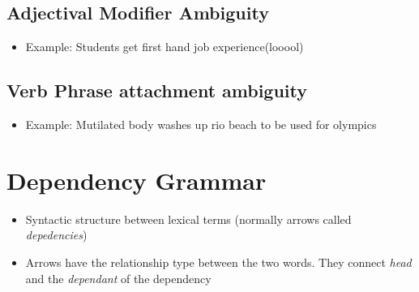 \documentclass[a4paper]{article}
\begin{document}
\subsection{Adjectival Modifier Ambiguity}
\begin{itemize}
    \item Example: Students get first hand job experience(looool)
\end{itemize}
\subsection{Verb Phrase attachment ambiguity}
\begin{itemize}
    \item Example: Mutilated body washes up rio beach to be used for olympics
\end{itemize}
\section{Dependency Grammar}
\begin{itemize}
    \item Syntactic structure between lexical terms (normally arrows called \textit{depedencies}) 
    \item Arrows have the relationship type between the two words. They connect \textit{head} and the \textit{dependant} of the dependency
\end{itemize}
\end{document}
